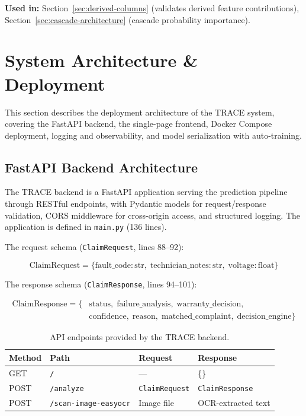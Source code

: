 \documentclass[10pt,a4paper]{article}
\begin{document}
\textbf{Used in:} Section~\ref{sec:derived-columns} (validates derived feature contributions), Section~\ref{sec:cascade-architecture} (cascade probability importance).

\section{System Architecture \& Deployment}
\label{sec:system-architecture}

This section describes the deployment architecture of the TRACE system, covering the FastAPI backend, the single-page frontend, Docker Compose deployment, logging and observability, and model serialization with auto-training.

\subsection{FastAPI Backend Architecture}
\label{sec:fastapi-backend}

The TRACE backend is a FastAPI application serving the prediction pipeline through RESTful endpoints, with Pydantic models for request/response validation, CORS middleware for cross-origin access, and structured logging. The application is defined in \texttt{main.py} (136 lines).

The request schema (\texttt{ClaimRequest}, lines 88--92):

\begin{equation}
\text{ClaimRequest} = \{\text{fault\_code}: \text{str},\; \text{technician\_notes}: \text{str},\; \text{voltage}: \text{float}\}
\label{eq:claim-request}
\end{equation}

The response schema (\texttt{ClaimResponse}, lines 94--101):

\begin{equation}
\begin{split}
\text{ClaimResponse} = \{&\text{status},\; \text{failure\_analysis},\; \text{warranty\_decision},\\
&\text{confidence},\; \text{reason},\; \text{matched\_complaint},\; \text{decision\_engine}\}
\end{split}
\label{eq:claim-response}
\end{equation}

\begin{table}[H]
\centering
\caption{API endpoints provided by the TRACE backend.}
\label{tab:api-endpoints}
\begin{tabular}{llR{3.5cm}R{3.5cm}}
\toprule
\textbf{Method} & \textbf{Path} & \textbf{Request} & \textbf{Response} \\
\midrule
GET  & \texttt{/}       & ---               & \{\} \\
POST & \texttt{/analyze} & \texttt{ClaimRequest} & \texttt{ClaimResponse} \\
POST & \texttt{/scan-image-easyocr} & Image file & OCR-extracted text \\
\bottomrule
\end{tabular}
\end{table}
\end{document}
